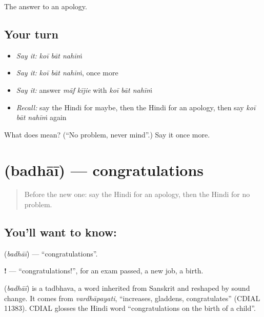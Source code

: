 \begin{grammarlens}[title={What you've built}]
The answer to an apology.
\end{grammarlens}

\subsection*{Your turn}
\begin{itemize}
\raggedright
  \item \emph{Say it:} \emph{koī bāt nahīṁ}
  \item \emph{Say it:} \emph{koī bāt nahīṁ}, once more
  \item \emph{Say it:} answer \emph{māf kījie} with \emph{koī bāt nahīṁ}
  \item \emph{Recall:} say the Hindi for maybe, then the Hindi for an apology, then say \emph{koī bāt nahīṁ} again
\end{itemize}

\begin{tcolorbox}[breakable,colback=teal!4,colframe=teal!35!black,title={Before you move on}]
What does    mean? (\textquotedblleft{}No problem, never mind\textquotedblright{}.) Say it once more.
\end{tcolorbox}
\section[\texorpdfstring{\hi{बधाई} (badhāī)}{बधाई (badhāī)}]{ (badhāī) — congratulations}

\label{lesson:HI-C114-badhai}



\begin{quote}
Before the new one: say the Hindi for an apology, then the Hindi for no problem.
\end{quote}

\subsection*{You'll want to know: }
\textbf{} (\emph{badhāī}) — \textquotedblleft{}congratulations\textquotedblright{}.

\textbf{ !} — \textquotedblleft{}congratulations!\textquotedblright{}, for an exam passed, a new job, a birth.

\begin{cousinweb}
\textbf{} (\emph{badhāī}) is a tadbhava, a word inherited from Sanskrit and reshaped by sound change. It comes from \emph{vardhāpayati}, \textquotedblleft{}increases, gladdens, congratulates\textquotedblright{} (CDIAL 11383). CDIAL glosses the Hindi word \textquotedblleft{}congratulations on the birth of a child\textquotedblright{}.
\end{cousinweb}

